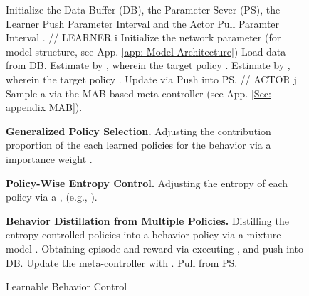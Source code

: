 \begin{figure}[ht]
  \centering
  \vspace{-0.1in}
  \begin{minipage}{\linewidth}
    \begin{algorithm}[H]
      \caption{Learnable Behavior Control}
          \begin{algorithmic}
          \STATE Initialize the Data Buffer (DB), the Parameter Sever (PS), the Learner Push Parameter Interval  and the Actor Pull Paramter Interval  .
          \STATE // LEARNER i
          \STATE Initialize the network parameter  (for model structure, see App. \ref{app: Model Architecture})
          \STATE Load data from DB.
          \STATE Estimate  by , wherein the target policy .
          \STATE Estimate  by , wherein the target policy .
          \STATE Update  via 
          \STATE Push  into PS.
          \ENDIF
          \ENDFOR
          \STATE // ACTOR j
            \STATE   Sample a  via the MAB-based meta-controller (see App. \ref{Sec: appendix MAB}).
            
            \STATE \textbf{Generalized Policy Selection.} Adjusting the contribution proportion of the each learned policies for the behavior via a importance weight .
            
            \STATE \textbf{Policy-Wise Entropy Control.} Adjusting  the entropy of each policy via a , (e.g., ).
            
            \STATE \textbf{Behavior Distillation from 
            Multiple Policies.} Distilling the entropy-controlled policies into a behavior policy  via a mixture model . 
            \STATE Obtaining episode  and reward  via executing , and push  into  DB.
            \STATE Update the meta-controller  with .
          \STATE Pull  from PS.
          \ENDIF
        \ENDFOR
          \end{algorithmic}
        \label{app alg:LBC}
    \end{algorithm}
  \end{minipage}
\end{figure}

\clearpage

